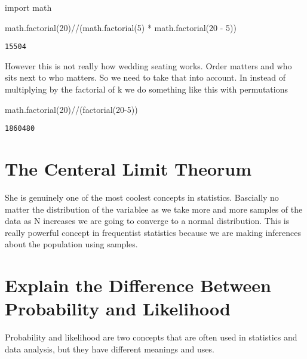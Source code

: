 \documentclass[
  letterpaper,
  DIV=11,
  numbers=noendperiod]{scrreprt}
\newenvironment{Shaded}{\begin{snugshade}}{\end{snugshade}}
\newcommand{\DecValTok}[1]{\textcolor[rgb]{0.68,0.00,0.00}{#1}}
\newcommand{\ImportTok}[1]{\textcolor[rgb]{0.00,0.46,0.62}{#1}}
\newcommand{\NormalTok}[1]{\textcolor[rgb]{0.00,0.23,0.31}{#1}}
\newcommand{\OperatorTok}[1]{\textcolor[rgb]{0.37,0.37,0.37}{#1}}
\begin{document}
\begin{Shaded}
\begin{Highlighting}[]
\ImportTok{import}\NormalTok{ math }

\NormalTok{math.factorial(}\DecValTok{20}\NormalTok{)}\OperatorTok{//}\NormalTok{(math.factorial(}\DecValTok{5}\NormalTok{) }\OperatorTok{*}\NormalTok{ math.factorial(}\DecValTok{20} \OperatorTok{{-}} \DecValTok{5}\NormalTok{))}
\end{Highlighting}
\end{Shaded}

\begin{verbatim}
15504
\end{verbatim}

However this is not really how wedding seating works. Order matters and
who sits next to who matters. So we need to take that into account. In
instead of multiplying by the factorial of k we do something like this
with permutations

\begin{Shaded}
\begin{Highlighting}[]
\NormalTok{math.factorial(}\DecValTok{20}\NormalTok{)}\OperatorTok{//}\NormalTok{(factorial(}\DecValTok{20}\OperatorTok{{-}}\DecValTok{5}\NormalTok{))}
\end{Highlighting}
\end{Shaded}

\begin{verbatim}
1860480
\end{verbatim}

\section{The Centeral Limit Theorum}\label{the-centeral-limit-theorum}

She is genuinely one of the most coolest concepts in statistics.
Bascially no matter the distribution of the variablee as we take more
and more samples of the data as N increases we are going to converge to
a normal distribution. This is really powerful concept in frequentist
statistics because we are making inferences about the population using
samples.

\section{Explain the Difference Between Probability and
Likelihood}\label{explain-the-difference-between-probability-and-likelihood}

Probability and likelihood are two concepts that are often used in
statistics and data analysis, but they have different meanings and uses.
\end{document}
